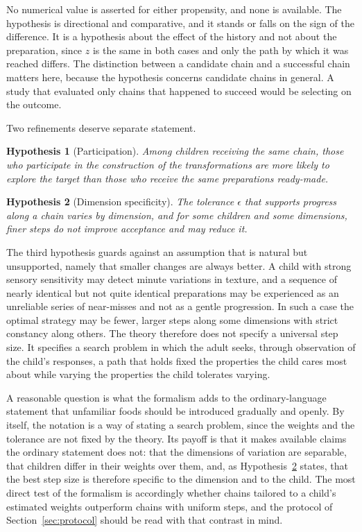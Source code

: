\documentclass[11pt]{article}
\newtheorem{hypothesis}{Hypothesis}
\theoremstyle{remark}
\begin{document}
No numerical value is asserted for either propensity, and none is available. The hypothesis is directional and comparative, and it stands or falls on the sign of the difference. It is a hypothesis about the effect of the history and not about the preparation, since $z$ is the same in both cases and only the path by which it was reached differs. The distinction between a candidate chain and a successful chain matters here, because the hypothesis concerns candidate chains in general. A study that evaluated only chains that happened to succeed would be selecting on the outcome.

Two refinements deserve separate statement.

\begin{hypothesis}[Participation]
Among children receiving the same chain, those who participate in the construction of the transformations are more likely to explore the target than those who receive the same preparations ready-made.
\end{hypothesis}

\begin{hypothesis}[Dimension specificity]\label{hyp:dim}
The tolerance $\epsilon$ that supports progress along a chain varies by dimension, and for some children and some dimensions, finer steps do not improve acceptance and may reduce it.
\end{hypothesis}

The third hypothesis guards against an assumption that is natural but unsupported, namely that smaller changes are always better. A child with strong sensory sensitivity may detect minute variations in texture, and a sequence of nearly identical but not quite identical preparations may be experienced as an unreliable series of near-misses and not as a gentle progression. In such a case the optimal strategy may be fewer, larger steps along some dimensions with strict constancy along others. The theory therefore does not specify a universal step size. It specifies a search problem in which the adult seeks, through observation of the child's responses, a path that holds fixed the properties the child cares most about while varying the properties the child tolerates varying.

A reasonable question is what the formalism adds to the ordinary-language statement that unfamiliar foods should be introduced gradually and openly. By itself, the notation is a way of stating a search problem, since the weights and the tolerance are not fixed by the theory. Its payoff is that it makes available claims the ordinary statement does not: that the dimensions of variation are separable, that children differ in their weights over them, and, as Hypothesis~\ref{hyp:dim} states, that the best step size is therefore specific to the dimension and to the child. The most direct test of the formalism is accordingly whether chains tailored to a child's estimated weights outperform chains with uniform steps, and the protocol of Section~\ref{sec:protocol} should be read with that contrast in mind.
\end{document}
